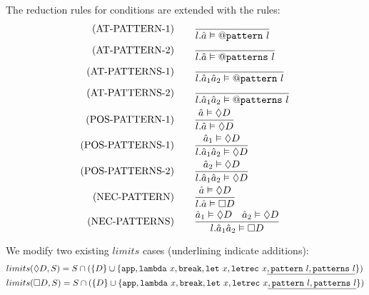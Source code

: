\documentclass[10pt,a4paper,english]{article}
\begin{document}
The reduction rules for conditions are extended with the rules:
\begin{align}
  (\text{AT-PATTERN-1})\qquad&\frac{}{l.\hat{a} \vDash @\texttt{pattern}~l}\\
  (\text{AT-PATTERN-2})\qquad&\frac{}{l.\hat{a} \vDash @\texttt{patterns}~l}\\
  (\text{AT-PATTERNS-1})\qquad&\frac{}{l.\hat{a}_1\hat{a}_2 \vDash @\texttt{pattern}~l}\\
  (\text{AT-PATTERNS-2})\qquad&\frac{}{l.\hat{a}_1\hat{a}_2 \vDash @\texttt{patterns}~l}\\
  (\text{POS-PATTERN-1})\qquad&\frac{\hat{a}\vDash\Diamond D}{l.\hat{a} \vDash \Diamond D}\\
  (\text{POS-PATTERNS-1})\qquad&\frac{\hat{a}_1\vDash\Diamond D}{l.\hat{a}_1\hat{a}_2 \vDash \Diamond D}\\
  (\text{POS-PATTERNS-2})\qquad&\frac{\hat{a}_2\vDash\Diamond D}{l.\hat{a}_1\hat{a}_2 \vDash \Diamond D}\\
  (\text{NEC-PATTERN})\qquad&\frac{\hat{a}\vDash\Diamond D}{l.\hat{a} \vDash \Box D}\\
  (\text{NEC-PATTERNS})\qquad&\frac{\hat{a}_1\vDash\Diamond D \quad \hat{a}_2\vDash\Diamond D}{l.\hat{a}_1\hat{a}_2 \vDash \Box D}
\end{align}

We modify two existing $limits$ cases (underlining indicate additions):
\begin{align}
&limits(\Diamond D, S) = S \cap (\{D\} \cup \{\texttt{app}, \texttt{lambda}~x, \texttt{break}, \texttt{let}~x, \texttt{letrec}~x\underline{, \texttt{pattern}~l, \texttt{patterns}~l}\})\\
&limits(\Box D, S) = S \cap (\{D\} \cup \{\texttt{app}, \texttt{lambda}~x, \texttt{break}, \texttt{let}~x, \texttt{letrec}~x\underline{, \texttt{pattern}~l, \texttt{patterns}~l} \})
\end{align}
\end{document}
